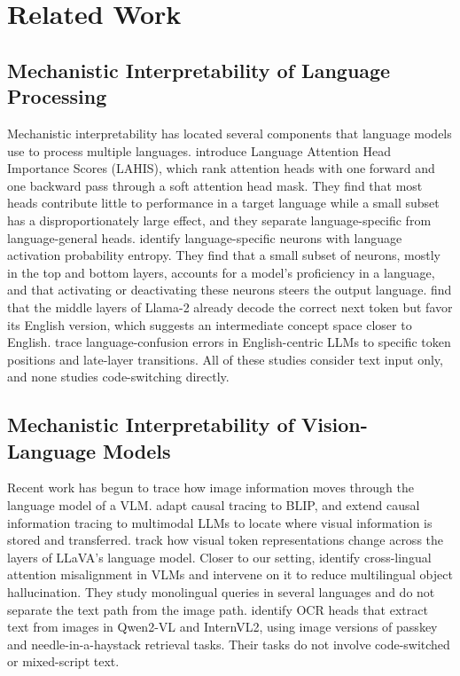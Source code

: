 \documentclass[10pt]{article}
\begin{document}
\section{Related Work}
\label{sec:related}

\subsection{Mechanistic Interpretability of Language Processing}

Mechanistic interpretability has located several components that language models use to process multiple languages. \citet{liu2026lahis} introduce Language Attention Head Importance Scores (LAHIS), which rank attention heads with one forward and one backward pass through a soft attention head mask. They find that most heads contribute little to performance in a target language while a small subset has a disproportionately large effect, and they separate language-specific from language-general heads. \citet{tang2024neurons} identify language-specific neurons with language activation probability entropy. They find that a small subset of neurons, mostly in the top and bottom layers, accounts for a model's proficiency in a language, and that activating or deactivating these neurons steers the output language. \citet{wendler2024llamas} find that the middle layers of Llama-2 already decode the correct next token but favor its English version, which suggests an intermediate concept space closer to English. \citet{nie2025confusion} trace language-confusion errors in English-centric LLMs to specific token positions and late-layer transitions. All of these studies consider text input only, and none studies code-switching directly.

\subsection{Mechanistic Interpretability of Vision-Language Models}

Recent work has begun to trace how image information moves through the language model of a VLM. \citet{palit2023towards} adapt causal tracing to BLIP, and \citet{basu2024understanding} extend causal information tracing to multimodal LLMs to locate where visual information is stored and transferred. \citet{neo2025towards} track how visual token representations change across the layers of LLaVA's language model. Closer to our setting, \citet{ye2025claim} identify cross-lingual attention misalignment in VLMs and intervene on it to reduce multilingual object hallucination. They study monolingual queries in several languages and do not separate the text path from the image path. \citet{baek2025ocr} identify OCR heads that extract text from images in Qwen2-VL and InternVL2, using image versions of passkey and needle-in-a-haystack retrieval tasks. Their tasks do not involve code-switched or mixed-script text.
\end{document}
